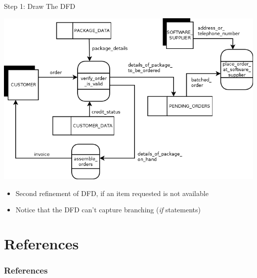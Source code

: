 \documentclass{beamer}
\begin{document}
	\begin{frame}{Step 1: Draw The DFD}
		\begin{center}
			\includegraphics[scale=0.3]{img/01_sally_dfd_second_refinement}
		\end{center}	
		\begin{itemize}
			\item Second refinement of DFD, if an item requested is not available
			\item Notice that the DFD can't capture branching (\textit{if} statements)
		\end{itemize}
	\end{frame}
	
	\section{References}
	\begin{frame}[allowframebreaks]
	        \frametitle{References}
	        
	        
	\end{frame}
\end{document}
